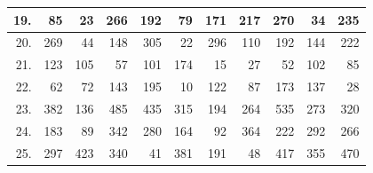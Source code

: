 \begin{table}[H]
{\begin{tabular}{|r|r|r|r|r|r|r|r|r|r|r|}
19.                    & 85                             & 23                              & 266                              & 192                              & 79                               & 171                              & 217                              & 270                              & 34                               & 235                              \\ \hline
20.                    & 269                            & 44                              & 148                              & 305                              & 22                               & 296                              & 110                              & 192                              & 144                              & 222                              \\ \hline
21.                    & 123                            & 105                             & 57                               & 101                              & 174                              & 15                               & 27                               & 52                               & 102                              & 85                               \\ \hline
22.                    & 62                             & 72                              & 143                              & 195                              & 10                               & 122                              & 87                               & 173                              & 137                              & 28                               \\ \hline
23.                    & 382                            & 136                             & 485                              & 435                              & 315                              & 194                              & 264                              & 535                              & 273                              & 320                              \\ \hline
24.                    & 183                            & 89                              & 342                              & 280                              & 164                              & 92                               & 364                              & 222                              & 292                              & 266                              \\ \hline
25.                    & 297                            & 423                             & 340                              & 41                               & 381                              & 191                              & 48                               & 417                              & 355                              & 470                              \\ \hline

\end{tabular}}
\end{table}
